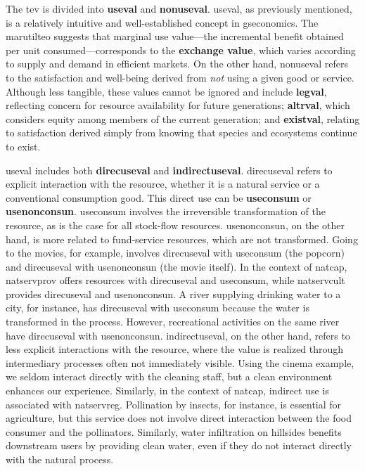 \documentclass[./main_en.tex]{subfiles}
\begin{document}
\par The \gls{tev} is divided into \textbf{\gls{useval}} and \textbf{\gls{nonuseval}}. \gls{useval}, as previously mentioned, is a relatively intuitive and well-established concept in \gls{gseconomics}. The \gls{marutilteo} suggests that marginal use value—the incremental benefit obtained per unit consumed—corresponds to the \textbf{exchange value}, which varies according to supply and demand in efficient markets. On the other hand, \gls{nonuseval} refers to the satisfaction and well-being derived from \textit{not} using a given good or service. Although less tangible, these values cannot be ignored and include \textbf{\gls{legval}}, reflecting concern for resource availability for future generations; \textbf{\gls{altrval}}, which considers equity among members of the current generation; and \textbf{\gls{existval}}, relating to satisfaction derived simply from knowing that species and ecosystems continue to exist.

\par \gls{useval} includes both \textbf{\gls{direcuseval}} and \textbf{\gls{indirectuseval}}. \gls{direcuseval} refers to explicit interaction with the resource, whether it is a natural service or a conventional consumption good. This direct use can be \textbf{\gls{useconsum}} or \textbf{\gls{usenonconsun}}. \gls{useconsum} involves the irreversible transformation of the resource, as is the case for all stock-flow resources. \gls{usenonconsun}, on the other hand, is more related to fund-service resources, which are not transformed. Going to the movies, for example, involves \gls{direcuseval} with \gls{useconsum} (the popcorn) and \gls{direcuseval} with \gls{usenonconsun} (the movie itself). In the context of \gls{natcap}, \gls{natservprov} offers resources with \gls{direcuseval} and \gls{useconsum}, while \gls{natservcult} provides \gls{direcuseval} and \gls{usenonconsun}. A river supplying drinking water to a city, for instance, has \gls{direcuseval} with \gls{useconsum} because the water is transformed in the process. However, recreational activities on the same river have \gls{direcuseval} with \gls{usenonconsun}. \gls{indirectuseval}, on the other hand, refers to less explicit interactions with the resource, where the value is realized through intermediary processes often not immediately visible. Using the cinema example, we seldom interact directly with the cleaning staff, but a clean environment enhances our experience. Similarly, in the context of \gls{natcap}, indirect use is associated with \gls{natservreg}. Pollination by insects, for instance, is essential for agriculture, but this service does not involve direct interaction between the food consumer and the pollinators. Similarly, water infiltration on hillsides benefits downstream users by providing clean water, even if they do not interact directly with the natural process.
\end{document}
